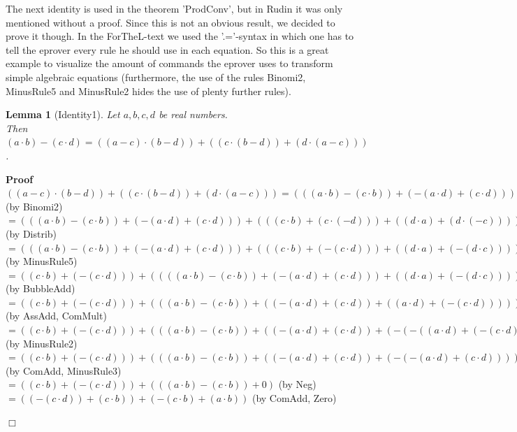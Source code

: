 \documentclass{article}
\newenvironment{forthel}{\begin{leftbar}}{\end{leftbar}}
\newenvironment{proof}{\noindent\textbf{Proof\ }}{\hspace*{\fill}$\Box$\medskip}
\newtheorem{lemma}{Lemma}
\newcommand{\dotequal}{=}
\begin{document}
\noindent The next identity is used in the theorem 'ProdConv', but in Rudin it was only mentioned without a proof. Since this is not an obvious result, we decided to prove it though. In the ForTheL-text we used the '.='-syntax in which one has to tell the eprover every rule he should use in each equation.
So this is a great example to visualize the amount of commands the eprover uses to transform simple algebraic equations (furthermore, the use of the rules Binomi2, MinusRule5 and MinusRule2 hides the use of plenty further rules).

\begin{forthel}
	
	\begin{lemma}[Identity1]
	Let $a,b,c,d$ be real numbers. 
	\\Then $(a \cdot b) - (c \cdot d) = ((a - c) \cdot (b - d)) + ((c \cdot (b - d)) + (d \cdot (a - c)))$.
	\end{lemma}
	\begin{proof}
	$((a - c) \cdot (b - d)) + ((c \cdot (b - d)) + (d \cdot (a - c))) 
	\dotequal (((a \cdot b) - (c \cdot b)) + (-(a \cdot d) + (c \cdot d))) + ((c \cdot (b - d)) + (d \cdot (a - c)))$ (by Binomi2)
	\\$\dotequal (((a \cdot b) - (c \cdot b)) + (-(a \cdot d) + (c \cdot d))) + (((c \cdot b) + (c \cdot (-d))) + ((d \cdot a) + (d \cdot (-c))))$ (by Distrib)
	\\$\dotequal (((a \cdot b) - (c \cdot b)) + (-(a \cdot d) + (c \cdot d))) + (((c \cdot b) + (-(c \cdot d))) + ((d \cdot a) + (-(d \cdot c))))$ (by MinusRule5)
	\\$\dotequal ((c \cdot b) + (-(c \cdot d))) + ((((a \cdot b) - (c \cdot b)) + (-(a \cdot d) + (c \cdot d))) + ((d \cdot a) + (-(d \cdot c))))$ (by BubbleAdd)
	\\$\dotequal ((c \cdot b) + (-(c \cdot d))) + (((a \cdot b) - (c \cdot b)) + ((-(a \cdot d) + (c \cdot d)) + ((a \cdot d) + (-(c \cdot d)))))$ (by AssAdd, ComMult)
	\\$\dotequal ((c \cdot b) + (-(c \cdot d))) + (((a \cdot b) - (c \cdot b)) + ((-(a \cdot d) + (c \cdot d)) + (-(-((a \cdot d) + (-(c \cdot d)))))))$ (by MinusRule2)
	\\$\dotequal ((c \cdot b) + (-(c \cdot d))) + (((a \cdot b) - (c \cdot b)) + ((-(a \cdot d) + (c \cdot d)) + (-(-(a \cdot d) + (c \cdot d)))))$ (by ComAdd, MinusRule3)
	\\$\dotequal ((c \cdot b) + (-(c \cdot d))) + (((a \cdot b) - (c \cdot b)) + 0)$ (by Neg)
	\\$\dotequal ((-(c \cdot d)) + (c \cdot b)) + (-(c \cdot b) + (a \cdot b))$ (by ComAdd, Zero)

\end{proof}
\end{forthel}
\end{document}

